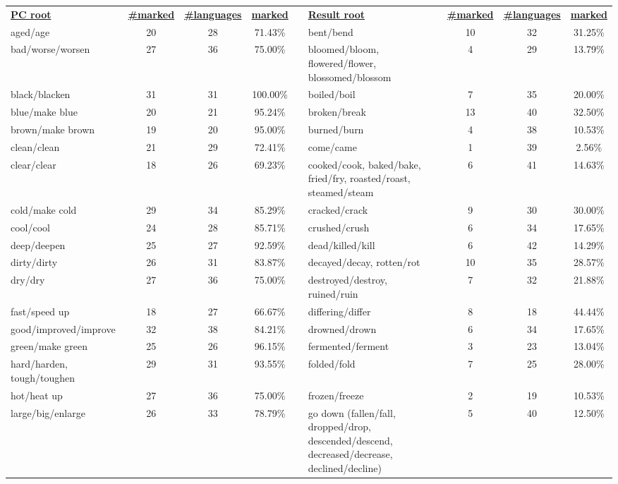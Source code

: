 \begin{tabular}{p{3cm}ccccp{3cm}ccc}
\underline{\textbf{PC root}} & \underline{\textbf{\#marked}} & \underline{\textbf{\#languages}} & \underline{\textbf{marked}} & & \underline{\textbf{Result root}} & \underline{\textbf{\#marked}} & \underline{\textbf{\#languages}} & \underline{\textbf{marked}} \\
aged/age & 20 & 28 & 71.43\% & & bent/bend & 10 & 32 & 31.25\% \\
bad/worse/worsen & 27 & 36 & 75.00\% & & bloomed/bloom, flowered/flower, blossomed/blossom & 4 & 29 & 13.79\% \\
black/blacken & 31 & 31 & 100.00\% & & boiled/boil & 7 & 35 & 20.00\% \\
blue/make blue & 20 & 21 & 95.24\% & & broken/break & 13 & 40 & 32.50\% \\
brown/make brown & 19 & 20 & 95.00\% & & burned/burn & 4 & 38 & 10.53\% \\
clean/clean & 21 & 29 & 72.41\% & & come/came & 1 & 39 & 2.56\% \\
clear/clear & 18 & 26 & 69.23\% & & cooked/cook, baked/bake, fried/fry, roasted/roast, steamed/steam & 6 & 41 & 14.63\% \\
cold/make cold & 29 & 34 & 85.29\% & & cracked/crack & 9 & 30 & 30.00\% \\
cool/cool & 24 & 28 & 85.71\% & & crushed/crush & 6 & 34 & 17.65\% \\
deep/deepen & 25 & 27 & 92.59\% & & dead/killed/kill & 6 & 42 & 14.29\% \\
dirty/dirty & 26 & 31 & 83.87\% & & decayed/decay, rotten/rot & 10 & 35 & 28.57\% \\
dry/dry & 27 & 36 & 75.00\% & & destroyed/destroy, ruined/ruin & 7 & 32 & 21.88\% \\
fast/speed up & 18 & 27 & 66.67\% & & differing/differ & 8 & 18 & 44.44\% \\
good/improved/improve & 32 & 38 & 84.21\% & & drowned/drown & 6 & 34 & 17.65\% \\
green/make green & 25 & 26 & 96.15\% & & fermented/ferment & 3 & 23 & 13.04\% \\
hard/harden, tough/toughen & 29 & 31 & 93.55\% & & folded/fold & 7 & 25 & 28.00\% \\
hot/heat up & 27 & 36 & 75.00\% & & frozen/freeze & 2 & 19 & 10.53\% \\
large/big/enlarge & 26 & 33 & 78.79\% & & go down (fallen/fall, dropped/drop, descended/descend, decreased/decrease, declined/decline) & 5 & 40 & 12.50\% \\

\end{tabular}
